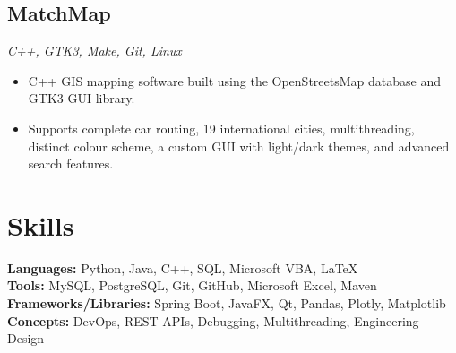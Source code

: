 \documentclass[10pt, a4paper]{article}
\begin{document}
\subsection*{MatchMap}
\textit{C++, GTK3, Make, Git, Linux}
\begin{itemize}
    \item C++ GIS mapping software built using the OpenStreetsMap database and GTK3 GUI library.
    \item Supports complete car routing, 19 international cities, multithreading, distinct colour scheme, a custom GUI with light/dark themes, and advanced search features.
\end{itemize}

\section*{Skills}
\textbf{Languages:} Python, Java, C++, SQL, Microsoft VBA, \LaTeX \\
\textbf{Tools:} MySQL, PostgreSQL, Git, GitHub, Microsoft Excel, Maven \\
\textbf{Frameworks/Libraries:} Spring Boot, JavaFX, Qt, Pandas, Plotly, Matplotlib \\
\textbf{Concepts:} DevOps, REST APIs, Debugging, Multithreading, Engineering Design
\end{document}
